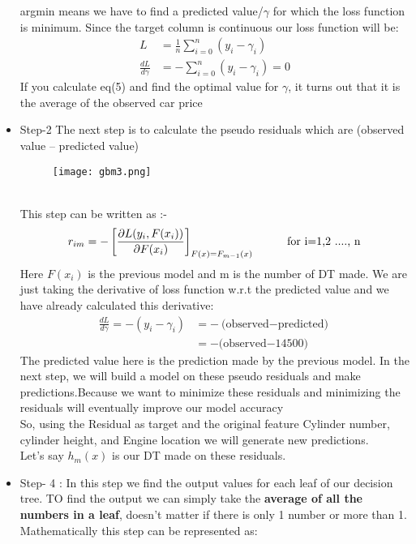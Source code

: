 \documentclass[a4paper, 11pt]{article}
\begin{document}
\begin{itemize}
         argmin means we have to find a predicted value/$\gamma$ for which the loss function is minimum.
         Since the target column is continuous our loss function will be:
         \begin{align}
            L &= \frac{1}{n} \sum_{i=0}^n(y_i-\gamma_i) \\
            \frac{dL}{d\gamma} &= -\sum_{i=0}^n(y_i - \gamma_i) = 0 
         \end{align}
         If you calculate eq(5) and find the optimal value for $\gamma$, it turns out that it is the average of the observed car price
        \item Step-2 The next step is to calculate the pseudo residuals which are (observed value – predicted value)
        \begin{figure}[h!]
            \centering
            \texttt{[image: gbm3.png]}
            \label{fig:fig3}
          \end{figure}\\
          This step can be written as :-
          \begin{align}
            r_{im} = - \left[\frac{\partial L(y_i,F(x_i))}{\partial F(x_i)}\right]_{F(x)=F_{m-1}(x)} \hspace{10mm} \text{for i=1,2 ...., n}
          \end{align}
          Here $F(x_i)$ is the previous model and m is the number of DT made.
          We are just taking the derivative of loss function w.r.t the predicted value and we have already calculated this derivative: 
          \begin{align}
            \frac{dL}{d\gamma} = -(y_i-\gamma_i) &= - \text{(observed$-$predicted)}\\
            &= - \text{(observed$- 14500$)}  
          \end{align}
          The predicted value here is the prediction made by the previous model. In the next step, we will build a model on these 
          pseudo residuals and make predictions.Because we want to minimize these residuals and minimizing the residuals will eventually 
          improve our model accuracy \\ 
          So, using the Residual as target and the original feature Cylinder number, cylinder height, and Engine location we will generate new predictions.\\
          Let’s say \textbf{$h_m(x)$} is our DT made on these residuals.
        \item Step- 4 : In this step we find the output values for each leaf of our decision tree. TO find the output we can simply take 
        the \textbf{average of all the numbers in a leaf}, doesn’t matter if there is only 1 number or more than 1.
        Mathematically this step can be represented as:


\end{itemize}
\end{document}
